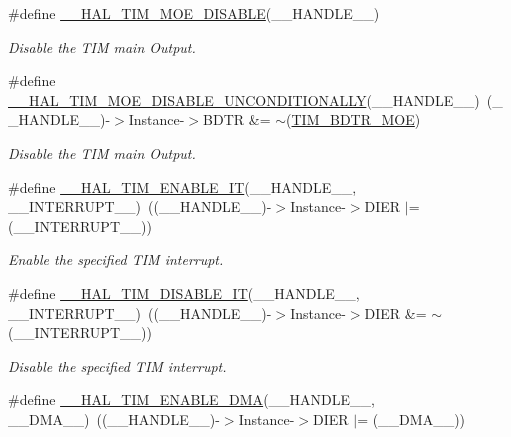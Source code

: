 \begin{DoxyCompactItemize}
\#define \hyperlink{group___t_i_m___exported___macros_ga69d63e147faeca8909e9679f684c0325}{\+\_\+\+\_\+\+H\+A\+L\+\_\+\+T\+I\+M\+\_\+\+M\+O\+E\+\_\+\+D\+I\+S\+A\+B\+LE}(\+\_\+\+\_\+\+H\+A\+N\+D\+L\+E\+\_\+\+\_\+)
\begin{DoxyCompactList}\small\item\em Disable the T\+IM main Output. \end{DoxyCompactList}\item 
\#define \hyperlink{group___t_i_m___exported___macros_gaa5c4053e8e57dc234efecbb698287b55}{\+\_\+\+\_\+\+H\+A\+L\+\_\+\+T\+I\+M\+\_\+\+M\+O\+E\+\_\+\+D\+I\+S\+A\+B\+L\+E\+\_\+\+U\+N\+C\+O\+N\+D\+I\+T\+I\+O\+N\+A\+L\+LY}(\+\_\+\+\_\+\+H\+A\+N\+D\+L\+E\+\_\+\+\_\+)~(\+\_\+\+\_\+\+H\+A\+N\+D\+L\+E\+\_\+\+\_\+)-\/$>$Instance-\/$>$B\+D\+TR \&= $\sim$(\hyperlink{group___peripheral___registers___bits___definition_ga277a096614829feba2d0a4fbb7d3dffc}{T\+I\+M\+\_\+\+B\+D\+T\+R\+\_\+\+M\+OE})
\begin{DoxyCompactList}\small\item\em Disable the T\+IM main Output. \end{DoxyCompactList}\item 
\#define \hyperlink{group___t_i_m___exported___macros_ga4d69943bc4716743c78e3194e259097e}{\+\_\+\+\_\+\+H\+A\+L\+\_\+\+T\+I\+M\+\_\+\+E\+N\+A\+B\+L\+E\+\_\+\+IT}(\+\_\+\+\_\+\+H\+A\+N\+D\+L\+E\+\_\+\+\_\+,  \+\_\+\+\_\+\+I\+N\+T\+E\+R\+R\+U\+P\+T\+\_\+\+\_\+)~((\+\_\+\+\_\+\+H\+A\+N\+D\+L\+E\+\_\+\+\_\+)-\/$>$Instance-\/$>$D\+I\+ER $\vert$= (\+\_\+\+\_\+\+I\+N\+T\+E\+R\+R\+U\+P\+T\+\_\+\+\_\+))
\begin{DoxyCompactList}\small\item\em Enable the specified T\+IM interrupt. \end{DoxyCompactList}\item 
\#define \hyperlink{group___t_i_m___exported___macros_ga31d67e905bc62e3142179dc4bbf8ba64}{\+\_\+\+\_\+\+H\+A\+L\+\_\+\+T\+I\+M\+\_\+\+D\+I\+S\+A\+B\+L\+E\+\_\+\+IT}(\+\_\+\+\_\+\+H\+A\+N\+D\+L\+E\+\_\+\+\_\+,  \+\_\+\+\_\+\+I\+N\+T\+E\+R\+R\+U\+P\+T\+\_\+\+\_\+)~((\+\_\+\+\_\+\+H\+A\+N\+D\+L\+E\+\_\+\+\_\+)-\/$>$Instance-\/$>$D\+I\+ER \&= $\sim$(\+\_\+\+\_\+\+I\+N\+T\+E\+R\+R\+U\+P\+T\+\_\+\+\_\+))
\begin{DoxyCompactList}\small\item\em Disable the specified T\+IM interrupt. \end{DoxyCompactList}\item 
\#define \hyperlink{group___t_i_m___exported___macros_gabb91ccd46cd7204c87170a1ea5b38135}{\+\_\+\+\_\+\+H\+A\+L\+\_\+\+T\+I\+M\+\_\+\+E\+N\+A\+B\+L\+E\+\_\+\+D\+MA}(\+\_\+\+\_\+\+H\+A\+N\+D\+L\+E\+\_\+\+\_\+,  \+\_\+\+\_\+\+D\+M\+A\+\_\+\+\_\+)~((\+\_\+\+\_\+\+H\+A\+N\+D\+L\+E\+\_\+\+\_\+)-\/$>$Instance-\/$>$D\+I\+ER $\vert$= (\+\_\+\+\_\+\+D\+M\+A\+\_\+\+\_\+))

\end{DoxyCompactItemize}
